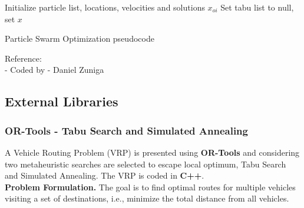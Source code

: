 \documentclass[10pt,bezier]{article}
\begin{document}
\begin{algorithm}[H]
\SetAlgoLined
{}
 Initialize particle list, locations, velocities and solutions $x_{oi}$\;
 Set tabu list to null, set $x$\;

 \caption{Particle Swarm Optimization pseudocode}
\end{algorithm}

\noindent Reference:\\
- Coded by - Daniel Zuniga
\newpage
\subsection{External Libraries}\label{section6.4}

\subsubsection{OR-Tools - Tabu Search and Simulated Annealing}\label{section6.4.1}
A Vehicle Routing Problem (VRP) is presented using {\color{blue}\textbf{OR-Tools}} and considering two metaheuristic searches are selected to escape local optimum, Tabu Search and Simulated Annealing. The VRP is coded in {\color{blue}\textbf{C++}}.\\

\textbf{Problem Formulation.}
 The goal is to find optimal routes for multiple vehicles visiting a set of destinations, i.e., minimize the total distance from all vehicles.\\
\end{document}
